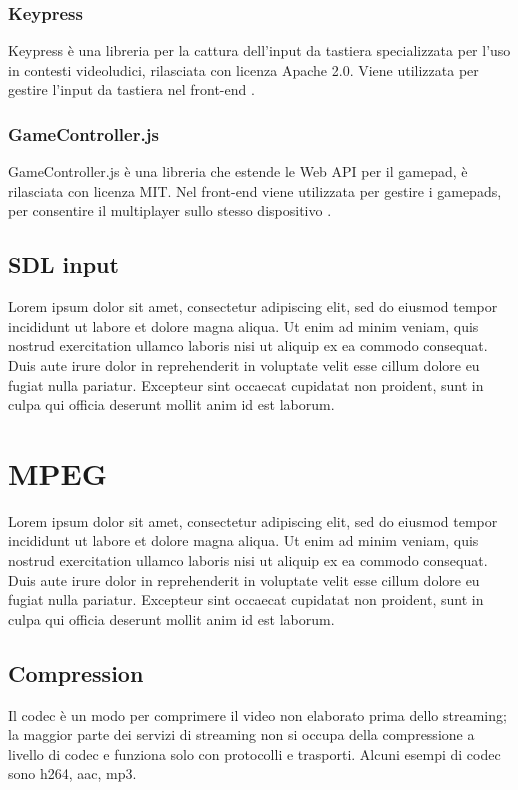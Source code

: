 \subsubsection{Keypress}
Keypress è una libreria per la cattura dell'input da tastiera specializzata per l'uso in contesti videoludici, rilasciata con licenza Apache 2.0. Viene utilizzata per gestire l'input da tastiera nel front-end \parencite{Keypress}.

\subsubsection{GameController.js}
GameController.js è una libreria che estende le Web API per il gamepad, è rilasciata con licenza MIT. Nel front-end viene utilizzata per gestire i gamepads, per consentire il multiplayer sullo stesso dispositivo \parencite{gameController_js}.


\subsection{SDL input}
Lorem ipsum dolor sit amet, consectetur adipiscing elit, sed do eiusmod tempor incididunt ut labore et dolore magna aliqua. Ut enim ad minim veniam, quis nostrud exercitation ullamco laboris nisi ut aliquip ex ea commodo consequat. Duis aute irure dolor in reprehenderit in voluptate velit esse cillum dolore eu fugiat nulla pariatur. Excepteur sint occaecat cupidatat non proident, sunt in culpa qui officia deserunt mollit anim id est laborum.



\section{MPEG} \label{sec:cap3_MPEG}
Lorem ipsum dolor sit amet, consectetur adipiscing elit, sed do eiusmod tempor incididunt ut labore et dolore magna aliqua. Ut enim ad minim veniam, quis nostrud exercitation ullamco laboris nisi ut aliquip ex ea commodo consequat. Duis aute irure dolor in reprehenderit in voluptate velit esse cillum dolore eu fugiat nulla pariatur. Excepteur sint occaecat cupidatat non proident, sunt in culpa qui officia deserunt mollit anim id est laborum.

\subsection{Compression}
Il codec è un modo per comprimere il video non elaborato prima dello streaming; la maggior parte dei servizi di streaming non si occupa della compressione a livello di codec e funziona solo con protocolli e trasporti. Alcuni esempi di codec sono h264, aac, mp3.

